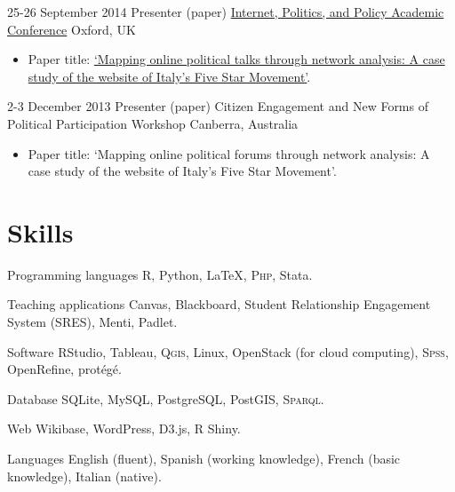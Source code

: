 \documentclass[11pt,a4paper,sans]{moderncv}
\begin{document}
    \cventry
        {25-26 September 2014} %
    {Presenter (paper)} %
    {\href{http://ipp.oii.ox.ac.uk/2014}{Internet, Politics, and Policy Academic Conference}} %
    {Oxford, UK} %
{}
    {
      \begin{itemize} %
        \item {Paper title: \href{http://ipp.oii.ox.ac.uk/2014/programme-2014/track-d-networked-politics/political-and-personal-networks/francesco-bailo-mapping-online-political}{`Mapping online political talks through network analysis: A case study of the website of Italy's Five Star Movement'}.}
      \end{itemize}
    }

    \cventry
     {2-3 December 2013} %
    {Presenter (paper)} %
    {Citizen Engagement and New Forms of Political Participation Workshop} %
    {Canberra, Australia} %
    {}
    {
      \begin{itemize} %
        \item {Paper title: `Mapping online political forums through network analysis: A case study of the website of Italy's Five Star Movement'.}
      \end{itemize}
    }

\section{Skills}

  \cvline
    {Programming languages} %
    {\textsc{R}, Python, LaTeX, \textsc{Php},  Stata.} 

  \cvline
    {Teaching applications} %
    {Canvas, Blackboard, Student Relationship Engagement System (SRES), Menti, Padlet.} 

  \cvline
    {Software} %
    {RStudio, Tableau, \textsc{Qgis}, Linux, OpenStack (for cloud computing), \textsc{Spss}, OpenRefine, protégé.} 

  \cvline
    {Database} %
    {SQLite, MySQL, PostgreSQL, PostGIS, \textsc{Sparql}.} %

  \cvline
    {Web} %
    {Wikibase, WordPress, D3.js, R Shiny.} %

  \cvline
    {Languages} %
    {English (fluent), Spanish (working knowledge), French (basic knowledge), Italian (native).} %
\end{document}
